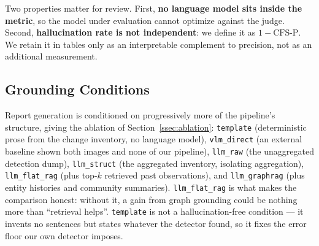 Two properties matter for review. First, \textbf{no language model sits inside
the metric}, so the model under evaluation cannot optimize against the judge.
Second, \textbf{hallucination rate is not independent}: we define it as
$1 - \text{CFS-P}$. We retain it in tables only as an interpretable complement
to precision, not as an additional measurement.

\subsection{Grounding Conditions}
\label{ssec:grounding}

Report generation is conditioned on progressively more of the pipeline's
structure, giving the ablation of Section~\ref{ssec:ablation}:
\texttt{template} (deterministic prose from the change inventory, no language
model), \texttt{vlm\_direct} (an external baseline shown both images and none
of our pipeline), \texttt{llm\_raw} (the unaggregated detection dump),
\texttt{llm\_struct} (the aggregated inventory, isolating aggregation),
\texttt{llm\_flat\_rag} (plus top-$k$ retrieved past observations), and
\texttt{llm\_graphrag} (plus entity histories and community summaries).
\texttt{llm\_flat\_rag} is what makes the comparison honest: without it, a gain
from graph grounding could be nothing more than ``retrieval helps''.
\texttt{template} is not a hallucination-free condition --- it invents no
sentences but states whatever the detector found, so it fixes the error floor
our own detector imposes.
